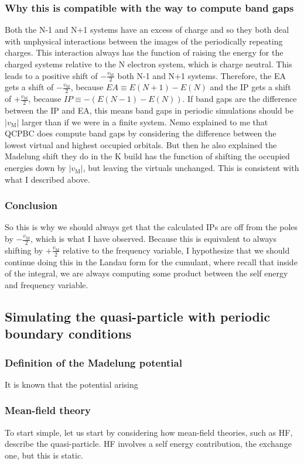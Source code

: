 \subsubsection{Why this is compatible with the way to compute band gaps}
Both the N-1 and N+1 systems have an excess of charge and so they both deal with unphysical interactions between the images of the periodically repeating charges. This interaction always has the function of raising the energy for the charged systems relative to the N electron system, which is charge neutral. This leads to a positive shift of $-\frac{v_{\mathrm{M}}}{2}$ both N-1 and N+1 systems. Therefore, the EA gets a shift of $-\frac{v_{\mathrm{M}}}{2}$, because $EA\equiv E(N+1)-E(N)$ and the IP gets a shift of $+\frac{v_{\mathrm{M}}}{2}$, because $IP\equiv -\left(E(N-1)-E(N)\right)$. If band gaps are the difference between the IP and EA, this means band gaps in periodic simulations should be $|v_{\mathrm{M}}|$ larger than if we were in a finite system. Nemo explained to me that QCPBC does compute band gaps by considering the difference between the lowest virtual and highest occupied orbitals. But then he also explained the Madelung shift they do in the K build has the function of shifting the occupied energies down by $|v_{\mathrm{M}}|$, but leaving the virtuals unchanged. This is consistent with what I described above.
\subsubsection{Conclusion}
So this is why we should always get that the calculated IPs are off from the poles by $-\frac{v_{\mathrm{M}}}{2}$, which is what I have observed. Because this is equivalent to always shifting by $+\frac{v_{\mathrm{M}}}{2}$ relative to the frequency variable, I hypothesize that we should continue doing this in the Landau form for the cumulant, where recall that inside of the integral, we are always computing some product between the self energy and frequency variable.


\subsection{Simulating the quasi-particle with periodic boundary conditions}
\subsubsection{Definition of the Madelung potential}
It is known that the potential arising
\subsubsection{Mean-field theory}
To start simple, let us start by considering how mean-field theories, such as HF, describe the quasi-particle. HF involves a self energy contribution, the exchange one, but this is static.
